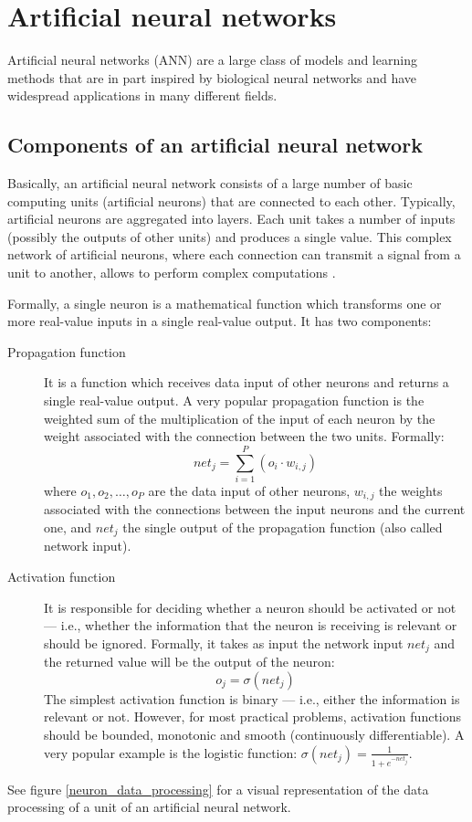 \chapter{Artificial neural networks}\label{ann_chapter}
    Artificial neural networks (ANN) are a large class of models and learning methods that are in part inspired by biological neural networks and have widespread applications in many different fields.
    
    \section{Components of an artificial neural network}
        Basically, an artificial neural network consists of a large number of basic computing units (artificial neurons) that are connected to each other. Typically, artificial neurons are aggregated into layers. Each unit takes a number of inputs (possibly the outputs of other units) and produces a single value. This complex network of artificial neurons, where each connection can transmit a signal from a unit to another, allows to perform complex computations \cite[82]{Mitchell}.
        
        Formally, a single neuron is a mathematical function which transforms one or more real-value inputs in a single real-value output. It has two components:
        \begin{description}
            \item[Propagation function] It is a function which receives data input of other neurons and returns a single real-value output. A very popular propagation function is the weighted sum of the multiplication of the input of each neuron by the weight associated with the connection between the two units. Formally:
            \[net_j = \sum_{i=1}^{P}\left(o_i \cdot w_{i,j}\right)\]
            where \(o_1, o_2, \dots, o_P\) are the data input of other neurons, \(w_{i,j}\) the weights associated with the connections between the input neurons and the current one, and \(net_j\) the single output of the propagation function (also called network input).
            \item[Activation function] It is responsible for deciding whether a neuron should be activated or not --- i.e., whether the information that the neuron is receiving is relevant or should be ignored. Formally, it takes as input the network input \(net_j\) and the returned value will be the output of the neuron:
            \[o_j = \sigma\left(net_j\right)\]
            The simplest activation function is binary --- i.e., either the information is relevant or not. However, for most practical problems, activation functions should be bounded, monotonic and smooth (continuously differentiable). A very popular example is the logistic function: \(\sigma\left(net_j\right) = \frac{1}{1+e^{-net_j}}\).
        \end{description}
        See figure \ref{neuron_data_processing} for a visual representation of the data processing of a unit of an artificial neural network.
        
